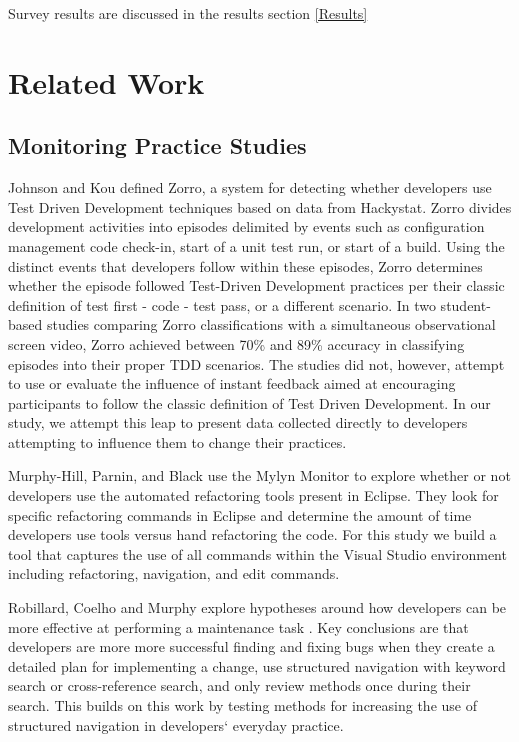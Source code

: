 \documentclass{sig-alternate}
\begin{document}
Survey results are discussed in the results section \ref{Results}

\section{Related Work}
\subsection{Monitoring Practice Studies }
Johnson and Kou defined Zorro\cite{V:Johnson2007Automated}, a system for detecting whether developers use Test Driven Development techniques based on data from Hackystat.  Zorro divides development activities into episodes delimited by events such as configuration management code check-in, start of a unit test run, or start of a build.  Using the distinct events that developers follow within these episodes, Zorro determines whether the episode followed Test-Driven Development practices per their classic definition of test first - code - test pass, or a different scenario.  In two student-based studies comparing Zorro classifications with a simultaneous observational screen video, Zorro achieved between 70\% \cite{Kou2010Operational} and 89\% \cite{V:Johnson2007Automated} accuracy in classifying episodes into their proper TDD scenarios.  The studies did not, however, attempt to use or evaluate the influence of instant feedback aimed at encouraging participants to follow the classic definition of Test Driven Development.  In our study, we attempt this leap to present data collected directly to developers attempting to influence them to change their practices.

Murphy-Hill, Parnin, and Black \cite{V:MurphyHill2012How} use the Mylyn Monitor to explore whether or not developers use the automated refactoring tools present in Eclipse.  They look for specific refactoring commands in Eclipse and determine the amount of time developers use tools versus hand refactoring the code.  For this study we build a tool that captures the use of all commands within the Visual Studio environment including refactoring, navigation, and edit commands.

Robillard, Coelho and Murphy explore hypotheses around how developers can be more effective at performing a maintenance task \cite{wbsnipes:Robillard2004How}.  Key conclusions are that developers are more more successful finding and fixing bugs when they create a detailed plan for implementing a change, use structured navigation with keyword search or cross-reference search, and only review methods once during their search.  This builds on this work by testing methods for increasing the use of structured navigation in developers` everyday practice.
\end{document}
